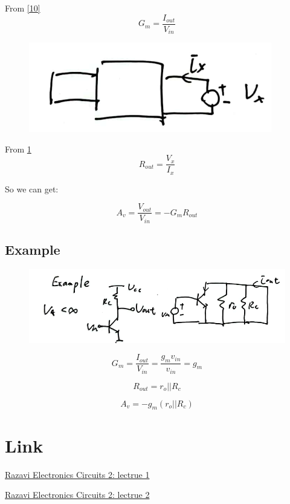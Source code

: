 \documentclass[fontset=windows]{article}
\begin{document}
From \ref{10}$$G_m=\frac{I_{out}}{V_{in}}$$

\begin{figure}
    \centering
    \includegraphics[scale=0.9]{11.jpg}
    \captionsetup{labelformat=empty}
    \caption{}
    \label{11}
\end{figure}

From \ref{11}$$R_{out}=\frac{V_x}{I_x}$$

So we can get: 

$$A_v=\frac{V_{out}}{V_{in}}=-G_mR_{out}$$

\subsection*{Example}

\begin{figure}[htbp]
    \centering
    \includegraphics[scale=0.6]{12.jpg}
    \captionsetup{labelformat=empty}
    \caption{}
    \label{12}
\end{figure}

$$G_m=\frac{I_{out}}{V_{in}}=\frac{g_mv_{in}}{v_{in}}=g_m$$

$$R_{out}=r_o||R_c$$

$$A_v=-g_m(r_o||R_c)$$

\section*{Link}

\href{https://www.bilibili.com/video/BV1Ef4y167SN/?spm_id_from=333.788.recommend_more_video.0&vd_source=1d0c07486a3bd3b0adb8ac548bf6453e}{Razavi Electronics Circuits 2: lectrue 1}

\href{https://www.bilibili.com/video/BV1Ef4y167SN?p=2&vd_source=1d0c07486a3bd3b0adb8ac548bf6453e}{Razavi Electronics Circuits 2: lectrue 2}
\end{document}
